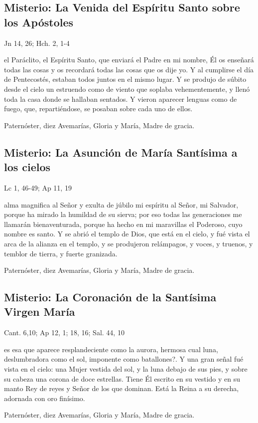 \documentclass[./00_main.tex]{subfiles}
\newcounter{glorious-counter}
\begin{document}
\subsection*{ Misterio: La Venida del Espíritu Santo sobre los Apóstoles}
\begin{flushright}
      {\color{red}Jn 14, 26; Hch. 2, 1-4}
\end{flushright}
 el Paráclito, el Espíritu Santo, que enviará el Padre en mi nombre, Él os enseñará todas las cosas y os recordará todas las cosas que os dije yo. 
Y al cumplirse el día de Pentecostés, estaban todos juntos en el mismo lugar. Y se produjo de súbito desde el cielo un estruendo como de viento que soplaba vehementemente, 
y llenó toda la casa donde se hallaban sentados. Y vieron aparecer lenguas como de fuego, que, repartiéndose, se posaban sobre cada uno de ellos.

\begin{center}
      Paternóster, diez Avemarías, Gloria y María, Madre de gracia.
\end{center}

\subsection*{ Misterio: La Asunción de María Santísima a los cielos}
\begin{flushright}
      {\color{red}Lc 1, 46-49; Ap 11, 19}
\end{flushright}
 alma magnifica al Señor y exulta de júbilo mi espíritu al Señor, mi Salvador, porque ha mirado la humildad de su sierva; 
por eso todas las generaciones me llamarán bienaventurada, porque ha hecho en mi maravillas el Poderoso, cuyo nombre es santo. Y se abrió el templo de Dios, que está en el cielo, 
y fué vista el arca de la alianza en el templo, y se produjeron relámpagos, y voces, y truenos, y temblor de tierra, y fuerte granizada.

\begin{center}
      Paternóster, diez Avemarías, Gloria y María, Madre de gracia.
\end{center}

\subsection*{ Misterio: La Coronación de la Santísima Virgen María}
\begin{flushright}
      {\color{red}Cant. 6,10; Ap 12, 1; 18, 16; Sal. 44, 10}
\end{flushright}
 es esa que aparece resplandeciente como la aurora, hermosa cual luna, deslumbradora como el sol, imponente como batallones?. 
Y una gran señal fué vista en el cielo: una Mujer vestida del sol, y la luna debajo de sus  pies, y sobre su cabeza una corona de doce estrellas. 
Tiene Él escrito en su vestido y en su manto Rey de reyes y Señor de los que dominan. Está la Reina a su derecha, adornada con oro finísimo.

\begin{center}
      Paternóster, diez Avemarías, Gloria y María, Madre de gracia.
\end{center}
\end{document}

